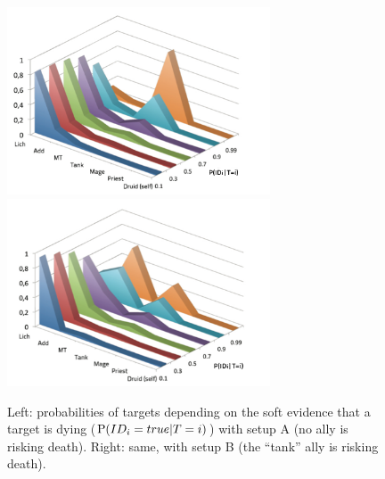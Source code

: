 \begin{figure}[h!]
\begin{center}
\includegraphics[width=7.8cm]{images/wow_distrib_target1.png} \includegraphics[width=7.8cm]{images/wow_distrib_target2.png}
\caption{Left: probabilities of targets depending on the soft evidence that a target is dying ($\mathrm{P}(ID_i=true | T=i)$) with setup A (no ally is risking death). Right: same, with setup B (the ``tank'' ally is risking death).}
\label{fig:wow_target}
\end{center}
\end{figure}
